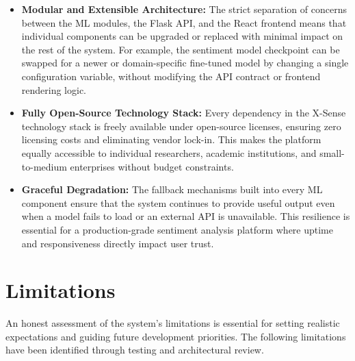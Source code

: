 \documentclass[12pt, a4paper]{report}
\begin{document}
\begin{itemize}[noitemsep, leftmargin=1.5em]
    \item \textbf{Modular and Extensible Architecture:} The strict separation of concerns between the ML modules, the Flask API, and the React frontend means that individual components can be upgraded or replaced with minimal impact on the rest of the system. For example, the sentiment model checkpoint can be swapped for a newer or domain-specific fine-tuned model by changing a single configuration variable, without modifying the API contract or frontend rendering logic.

    \item \textbf{Fully Open-Source Technology Stack:} Every dependency in the X-Sense technology stack is freely available under open-source licenses, ensuring zero licensing costs and eliminating vendor lock-in. This makes the platform equally accessible to individual researchers, academic institutions, and small-to-medium enterprises without budget constraints.

    \item \textbf{Graceful Degradation:} The fallback mechanisms built into every ML component ensure that the system continues to provide useful output even when a model fails to load or an external API is unavailable. This resilience is essential for a production-grade sentiment analysis platform where uptime and responsiveness directly impact user trust.
\end{itemize}

\section{Limitations}

An honest assessment of the system's limitations is essential for setting realistic expectations and guiding future development priorities. The following limitations have been identified through testing and architectural review.
\end{document}
